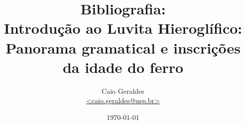 \documentclass[article,a4paper,oneside,12pt]{memoir}
\title{Bibliografia:\\Introdução ao Luvita Hieroglífico:\\\large Panorama gramatical e inscrições da idade do ferro}
\author{Caio Geraldes\\\href{mailto:caio.geraldes@usp.br}{<caio.geraldes@usp.br>}}
\date{\today}
\begin{document}
\maketitle

\nocite{*}

\printbibliography%
\end{document}
